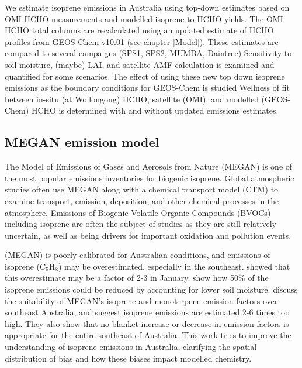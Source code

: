     We estimate isoprene emissions in Australia using top-down estimates based on OMI HCHO measurements and modelled isoprene to HCHO yields.
    The OMI HCHO total columns are recalculated using an updated estimate of HCHO profiles from GEOS-Chem v10.01 (see chapter \ref{Model}).
    These estimates are compared to several campaigns (SPS1, SPS2, MUMBA, Daintree) 
    Sensitivity to soil moisture, (maybe) LAI, and satellite AMF calculation is examined and quantified for some scenarios.
    The effect of using these new top down isoprene emissions as the boundary conditions for GEOS-Chem is studied
    Wellness of fit between in-situ (at Wollongong) HCHO, satellite (OMI), and modelled (GEOS-Chem) HCHO is determined with and without updated emissions estimates.
    
  \subsection{MEGAN emission model}
    The Model of Emissions of Gases and Aerosols from Nature (MEGAN) is one of the most popular emissions inventories for biogenic isoprene.
    Global atmospheric studies often use MEGAN along with a chemical transport model (CTM) to examine transport, emission, deposition, and other chemical processes in the atmosphere.
    Emissions of Biogenic Volatile Organic Compounds (BVOCs) including isoprene are often the subject of studies as they are still relatively uncertain, as well as being drivers for important oxidation and pollution events.
    
    (MEGAN) is poorly calibrated for Australian conditions, and emissions of isoprene (C$_5$H$_8$) may be overestimated, especially in the southeast.
    \textcite{Stavrakou2015} showed that this overestimate may be a factor of 2-3 in January.
    \textcite{Sindelarova2014} show how 50\% of the isoprene emissions could be reduced by accounting for lower soil moisture.
    \textcite{Emmerson2016} discuss the suitability of MEGAN's isoprene and monoterpene emission factors over southeast Australia, and suggest isoprene emissions are estimated 2-6 times too high.
    They also show that no blanket increase or decrease in emission factors is appropriate for the entire southeast of Australia.
    This work tries to improve the understanding of isoprene emissions in Australia, clarifying the spatial distribution of bias and how these biases impact modelled chemistry.
  
